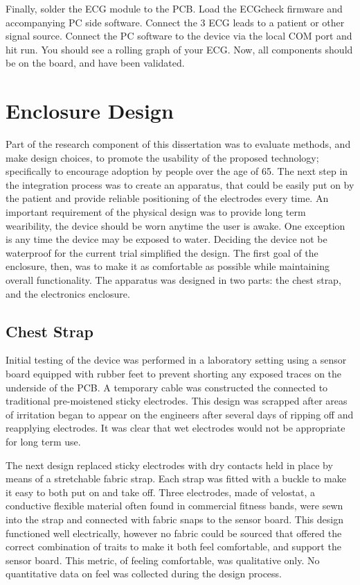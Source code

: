 Finally, solder the ECG module to the PCB. Load the ECGcheck firmware and accompanying PC side software. Connect the 3 ECG leads to a patient or other signal source. Connect the PC software to the device via the local COM port and hit run. You should see a rolling graph of your ECG. Now, all components should be on the board, and have been validated.


\section {Enclosure Design}
\label{sec:EnclosureDesign}
Part of the research component of this dissertation was to evaluate methods, and make design choices, to promote the usability of the  proposed technology; specifically to encourage adoption by people over the age of 65. The next step in the integration process was to create an apparatus, that could be easily put on by the patient and provide reliable positioning of the electrodes every time. An important requirement of the physical design was to provide long term wearibility, the device should be worn anytime the user is awake. One exception is any time the device may be exposed to water. Deciding the device not be waterproof for the current trial simplified the design. The first goal of the enclosure, then, was to make it as comfortable as possible while maintaining overall functionality. The apparatus was designed in two parts: the chest strap, and the electronics enclosure.

\subsection {Chest Strap}
Initial testing of the device was performed in a laboratory setting using a sensor board equipped with rubber feet to prevent shorting any exposed traces on the underside of the PCB. A temporary cable was constructed the connected to traditional pre-moistened sticky electrodes. This design was scrapped after areas of irritation began to appear on the engineers after several days of ripping off and reapplying electrodes. It was clear that wet electrodes would not be appropriate for long term use.

The next design replaced sticky electrodes with dry contacts held in place by means of a stretchable fabric strap. Each strap was fitted with a buckle to make it easy to both put on and take off. Three electrodes, made of velostat, a conductive flexible material often found in commercial fitness bands, were sewn into the strap and connected with fabric snaps to the sensor board. This design functioned well electrically, however no fabric could be sourced that offered the correct combination of traits to make it both feel comfortable, and support the sensor board. This metric, of feeling comfortable, was qualitative only. No quantitative data on feel was collected during the design process.

